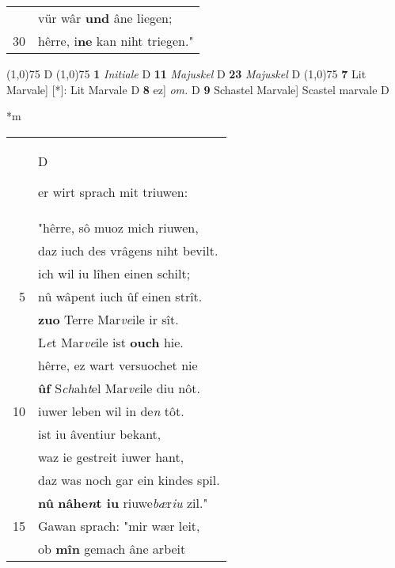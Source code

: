 \documentclass[8pt,a4paper,notitlepage]{article}
\begin{document}
\begin{table}[ht]
\begin{minipage}[t]{0.5\linewidth}
\begin{tabular}{rl}
 & vür wâr \textbf{und} âne liegen;\\ 
30 & hêrre, i\textbf{ne} kan niht triegen."\\ 
\end{tabular}
\scriptsize
\line(1,0){75} \newline
D \newline
\line(1,0){75} \newline
\textbf{1} \textit{Initiale} D  \textbf{11} \textit{Majuskel} D  \textbf{23} \textit{Majuskel} D  \newline
\line(1,0){75} \newline
\textbf{7} Lit Marvale] [*]: Lit Marvale D \textbf{8} ez] \textit{om.} D \textbf{9} Schastel Marvale] Scastel marvale D \newline
\end{minipage}
\hspace{0.5cm}
\begin{minipage}[t]{0.5\linewidth}
\small
\begin{center}*m
\end{center}
\begin{tabular}{rl}
 & \begin{large}D\end{large}er wirt sprach mit triuwen:\\ 
 & "hêrre, sô muoz mich riuwen,\\ 
 & daz iuch des vrâgens niht bevilt.\\ 
 & ich wil iu lîhen einen schilt;\\ 
5 & nû wâpent iuch ûf einen strît.\\ 
 & \textbf{zuo} Terre Mar\textit{ve}ile ir sît.\\ 
 & L\textit{e}t Mar\textit{ve}ile ist \textbf{ouch} hie.\\ 
 & hêrre, ez wart versuochet nie\\ 
 & \textbf{ûf} S\textit{ch}ah\textit{t}el Mar\textit{ve}ile diu nôt.\\ 
10 & iuwer leben wil in de\textit{n} tôt.\\ 
 & ist iu âventiur bekant,\\ 
 & waz ie gestreit iuwer hant,\\ 
 & daz was noch gar ein kindes spil.\\ 
 & \textbf{nû} \textbf{nâhe\textit{n}t iu} riuwe\textit{bæ}r\textit{iu} zil."\\ 
15 & Gawan sprach: "mir wær leit,\\ 
 & ob \textbf{mîn} gemach âne arbeit\\ 

\end{tabular}
\end{minipage}
\end{table}
\end{document}
